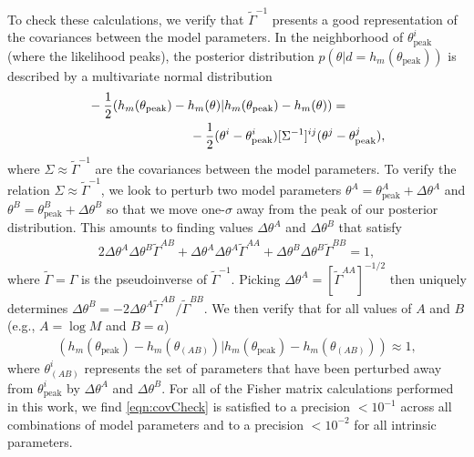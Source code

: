 \documentclass[%
 reprint,
 nofootinbib,
 amsmath,amssymb,
 aps,
 prd,
]{revtex4-2}
\begin{document}
To check these calculations, we verify that $\tilde{\Gamma}^{-1}$ presents a good representation of the covariances between the model parameters. In the neighborhood of $\theta^i_\mathrm{peak}$ (where the likelihood peaks), the posterior distribution $p(\theta | d=h_m(\theta_\mathrm{peak}))$ is described by a multivariate normal distribution
\begin{align}
    &-\frac{1}{2}(h_m(\theta_\mathrm{peak})-h_m(\theta)| h_m(\theta_\mathrm{peak})-h_m(\theta)) =
    \\ \notag
    &\qquad \qquad \qquad \qquad -\frac{1}{2}(\theta^{i} - \theta_\mathrm{peak}^i)[\Sigma^{-1}]^{ij}(\theta^{j} - \theta_\mathrm{peak}^j),
\end{align}
where $\Sigma \approx \tilde{\Gamma}^{-1}$ are the covariances between the model parameters. To verify the relation $\Sigma \approx \tilde{\Gamma}^{-1}$, we look to perturb two model parameters $\theta^A = \theta^A_\mathrm{peak} + \Delta \theta^A$ and $\theta^B= \theta^B_\mathrm{peak} + \Delta \theta^B$ so that we move one-$\sigma$ away from the peak of our posterior distribution. This amounts to finding values $\Delta\theta^A$ and $\Delta\theta^B$ that satisfy
\begin{align}
    2\Delta \theta^{A}\Delta\theta^{B} \tilde{\Gamma}^{AB} + \Delta \theta^{A}\Delta\theta^{A} \tilde{\Gamma}^{AA} + \Delta \theta^{B}\Delta\theta^{B} \tilde{\Gamma}^{BB} = 1,
\end{align}
where $\tilde{\Gamma} = \Gamma$ is the pseudoinverse of $\tilde{\Gamma}^{-1}$. Picking $\Delta \theta^{A} = \left[\tilde{\Gamma}^{AA}\right]^{-1/2}$ then uniquely determines $\Delta \theta^{B} = -2 \Delta\theta^{A}  \tilde{\Gamma}^{AB}/\tilde{\Gamma}^{BB}$. We then verify that for all values of $A$ and $B$ (e.g., $A = \log M$ and $B = a$)
\begin{align} \label{eqn:covCheck}
    (h_m(\theta_\mathrm{peak})-h_m(\theta_{(AB)})| h_m(\theta_\mathrm{peak})-h_m(\theta_{(AB)})) \approx 1,
\end{align}
where $\theta^i_{(AB)}$ represents the set of parameters that have been perturbed away from $\theta^i_\mathrm{peak}$ by $\Delta \theta^A$ and $\Delta \theta^B$. For all of the Fisher matrix calculations performed in this work, we find \eqref{eqn:covCheck} is satisfied to a precision $< 10^{-1}$ across all combinations of model parameters and to a precision $<10^{-2}$ for all intrinsic parameters.
\end{document}
